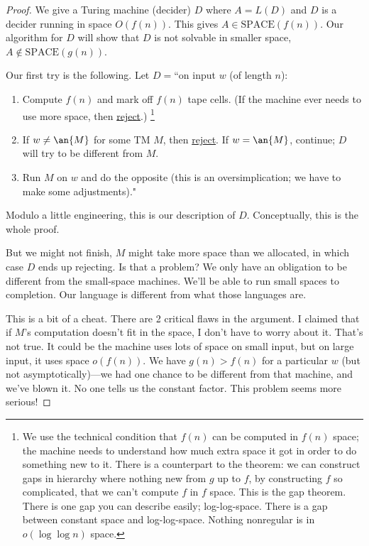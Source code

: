 \begin{proof}
We give a Turing machine (decider) $D$ where $A=L(D)$ and $D$ is a decider running in space $O(f(n))$. This gives $A\in \text{SPACE}(f(n))$. Our algorithm for $D$ will show that $D$ is not solvable in smaller space, $A\nin \text{SPACE}(g(n))$.

Our first try is the following. Let $D=$``on input $w$ (of length $n$):
\begin{enumerate}
\item
Compute $f(n)$ and mark off $f(n)$ tape cells. (If the machine ever needs to use more space, then \ul{reject}.)
\footnote{We use the technical condition that $f(n)$ can be computed in $f(n)$ space; 
the machine needs to understand how much extra space it got in order to do something new to it. There is a counterpart to the theorem: we can construct gaps in hierarchy where nothing new from $g$ up to $f$, by constructing $f$ so complicated, that we can't compute $f$ in $f$ space. This is the gap theorem. There is one gap you can describe easily; log-log-space. There is a gap between constant space and log-log-space. Nothing nonregular is in $o(\log\log n)$ space.} %

\item
If $w\ne\an{M}$ for some TM $M$, then \ul{reject}.
If $w=\an{M}$, continue; $D$ will try to be different from $M$.
\item
Run $M$ on $w$ and do the opposite (this is an oversimplication; we have to make some adjustments)."
\end{enumerate}
Modulo a little engineering, this is our description of $D$. Conceptually, this is the whole proof.

But we might not finish, $M$ might take more space than we allocated, in which case $D$ ends up rejecting.
Is that a problem? We only have an obligation to be different from the small-space machines. We'll be able to run small spaces to completion. Our language is different from what those languages are.

This is a bit of a cheat. There are 2 critical flaws in the argument. I claimed that if $M$'s computation doesn't fit in the space, I don't have to worry about it. That's not true. It could be the machine uses lots of space on small input, but on large input, it uses space $o(f(n))$. We have $g(n)>f(n)$ for a particular $w$ (but not asymptotically)---we had one chance to be different from that machine, and we've blown it. %
No one tells us the constant factor. %
This problem seems more serious!


\end{proof}
